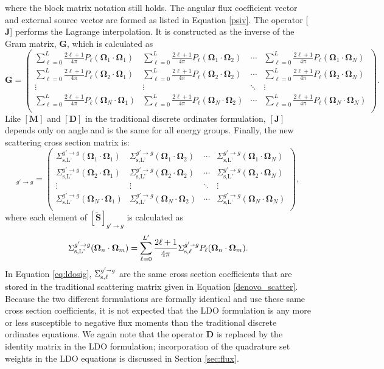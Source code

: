 \documentclass{article} %
\newcommand{\sa}{\shortrightarrow}
\newcommand{\bo}{\mathbf\Omega}
\newcommand{\ve}[1]{\ensuremath{\mathbf{#1}}}
\newcommand{\Sigg}[1]{\ensuremath{\Sigma^{g'\sa g}_{\text{s},#1}}}
\newcommand{\Gij}[2]{\sum_{\ell=0}^L\frac{2\ell+1}{4\pi}P_{\ell}(\bo_#1\cdot\bo_#2)}
\newcommand{\Sij}[2]{\Sigma^{g'\rightarrow g}_{\text{s,L'}}(\bo_#1\cdot\bo_#2)}
\begin{document}
%
where the block matrix notation still holds. The angular flux
coefficient vector and external source vector are formed as listed in Equation
\eqref{psiv}. The operator [$\ve{J}$] performs the Lagrange interpolation. It is
constructed as the inverse of the Gram matrix, $\ve{G}$, which is calculated as
%
\begin{equation}
  \ve{G} = \begin{pmatrix}
    \Gij{1}{1} & \Gij{1}{2} & \cdots & \Gij{1}{N} \\
    \Gij{2}{1} & \Gij{2}{2} & \cdots & \Gij{2}{N} \\
    \vdots     & \vdots     & \ddots & \vdots     \\
    \Gij{N}{1} & \Gij{N}{2} & \cdots & \Gij{N}{N} \\
  \end{pmatrix}.
\label{gram}
\end{equation}
%
Like $[\ve{M}]$ and $[\ve{D}]$ in the traditional discrete ordinates
formulation, $[\ve{J}]$ depends only on angle and is the same for all 
energy groups. Finally, the new scattering cross section matrix is:
%
\begin{equation}
  [\ve{\tilde{S}}]_{g'\rightarrow g} = \begin{pmatrix}
    \Sij{1}{1} & \Sij{1}{2} & \cdots & \Sij{1}{N} \\
    \Sij{2}{1} & \Sij{2}{2} & \cdots & \Sij{2}{N} \\
    \vdots     & \vdots     & \ddots & \vdots     \\
    \Sij{N}{1} & \Sij{N}{2} & \cdots & \Sij{N}{N} \\
  \end{pmatrix},
\label{ldo_scatter}
\end{equation}
%
where each element of $[\ve{\tilde{S}}]_{g'\rightarrow g}$ is
calculated as
%
\begin{equation}
\Sij{n}{m} = \sum_{\ell=0}^{L'} \frac{2\ell +1}{4\pi}\Sigg{\ell}
P_{\ell}(\bo_n \cdot\bo_m).
\label{eq:ldosig}
\end{equation}
%
In Equation \eqref{eq:ldosig}, $\Sigg{\ell}$ are the same cross section
coefficients that are stored in the traditional scattering matrix given in
Equation \eqref{denovo_scatter}. Because the two different formulations are
formally identical and use these same cross section coefficients, it is not
expected that the LDO formulation is any more or less susceptible to negative
flux moments than the traditional discrete ordinates equations. We again note
that the operator $\ve{D}$ is replaced by the identity matrix in the LDO
formulation; incorporation of the quadrature set weights in the LDO equations
is discussed in Section \ref{sec:flux}.
\end{document}
